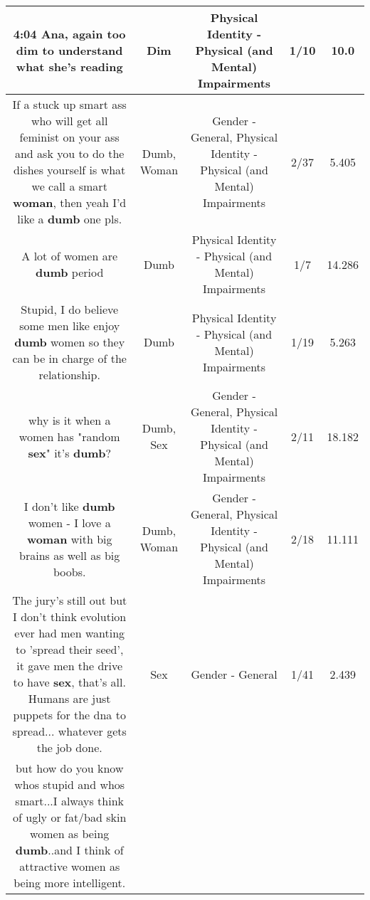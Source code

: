 \documentclass[11pt]{article}
\newlength\mylength
\begin{document}
\begin{center}
\begin{longtable}{|C{.65\mylength}|C{.30\mylength}|C{.12\mylength}|C{.12\mylength}|C{.12\mylength}|}
  \small 4:04 Ana, again too \textbf{dim} to understand what she's reading\normalsize   & Dim & Physical Identity - Physical (and Mental) Impairments & 1/10 & 10.0 \\  \hline
  \small If a stuck up smart ass who will get all feminist on your ass and ask you to do the dishes yourself is what we call a smart \textbf{woman}, then yeah I'd like a \textbf{dumb} one pls.\normalsize   & Dumb, Woman & Gender - General, Physical Identity - Physical (and Mental) Impairments & 2/37 & 5.405 \\  \hline
  \small A lot of women are \textbf{dumb} period\normalsize   & Dumb & Physical Identity - Physical (and Mental) Impairments & 1/7 & 14.286 \\  \hline
  \small Stupid, I do believe some men like enjoy \textbf{dumb} women so they can be in charge of the relationship.\normalsize   & Dumb & Physical Identity - Physical (and Mental) Impairments & 1/19 & 5.263 \\  \hline
  \small why is it when a women has "random \textbf{sex}" it's \textbf{dumb}?\normalsize   & Dumb, Sex & Gender - General, Physical Identity - Physical (and Mental) Impairments & 2/11 & 18.182 \\  \hline
  \small I don't like \textbf{dumb} women - I love a \textbf{woman} with big brains as well as big boobs.\normalsize   & Dumb, Woman & Gender - General, Physical Identity - Physical (and Mental) Impairments & 2/18 & 11.111 \\  \hline
  \small The jury's still out but I don't think evolution ever had men wanting to 'spread their seed', it gave men the drive to have \textbf{sex}, that's all. Humans are just puppets for the dna to spread... whatever gets the job done.\normalsize   & Sex & Gender - General & 1/41 & 2.439 \\  \hline
  \small but how do you know whos stupid and whos smart...I always think of ugly or fat/bad skin women as being \textbf{dumb}..and I think of attractive women as being more intelligent.


\end{longtable}
\end{center}
\end{document}
